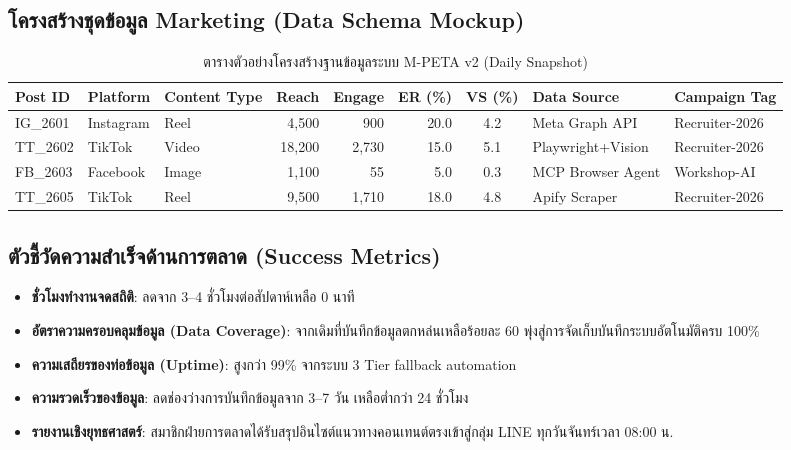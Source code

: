 \documentclass[10pt,a4paper]{article}
\begin{document}
\subsection{โครงสร้างชุดข้อมูล Marketing (Data Schema Mockup)}
\begin{table}[h!]
  \centering
  \caption{\chulafont ตารางตัวอย่างโครงสร้างฐานข้อมูลระบบ M-PETA v2 (Daily Snapshot)}
  \begin{tabular}{lllrrrcll}
    \toprule
    \textbf{Post ID} & \textbf{Platform} & \textbf{Content Type} & \textbf{Reach} & \textbf{Engage} & \textbf{ER (\%)} & \textbf{VS (\%)} & \textbf{Data Source} & \textbf{Campaign Tag} \\
    \midrule
    IG\_2601 & Instagram & Reel & 4,500 & 900 & 20.0 & 4.2 & Meta Graph API & Recruiter-2026 \\
    TT\_2602 & TikTok & Video & 18,200 & 2,730 & 15.0 & 5.1 & Playwright+Vision & Recruiter-2026 \\
    FB\_2603 & Facebook & Image & 1,100 & 55 & 5.0 & 0.3 & MCP Browser Agent & Workshop-AI \\
    TT\_2605 & TikTok & Reel & 9,500 & 1,710 & 18.0 & 4.8 & Apify Scraper & Recruiter-2026 \\
    \bottomrule
  \end{tabular}
\end{table}

\subsection{ตัวชี้วัดความสำเร็จด้านการตลาด (Success Metrics)}
\begin{itemize}
  \item \textbf{ชั่วโมงทำงานจดสถิติ}: ลดจาก 3--4 ชั่วโมงต่อสัปดาห์เหลือ 0 นาที
  \item \textbf{อัตราความครอบคลุมข้อมูล (Data Coverage)}: จากเดิมที่บันทึกข้อมูลตกหล่นเหลือร้อยละ 60 พุ่งสู่การจัดเก็บบันทึกระบบอัตโนมัติครบ 100\%
  \item \textbf{ความเสถียรของท่อข้อมูล (Uptime)}: สูงกว่า 99\% จากระบบ 3 Tier fallback automation
  \item \textbf{ความรวดเร็วของข้อมูล}: ลดช่องว่างการบันทึกข้อมูลจาก 3--7 วัน เหลือต่ำกว่า 24 ชั่วโมง
  \item \textbf{รายงานเชิงยุทธศาสตร์}: สมาชิกฝ่ายการตลาดได้รับสรุปอินไซต์แนวทางคอนเทนต์ตรงเข้าสู่กลุ่ม LINE ทุกวันจันทร์เวลา 08:00 น.
\end{itemize}
\end{document}
